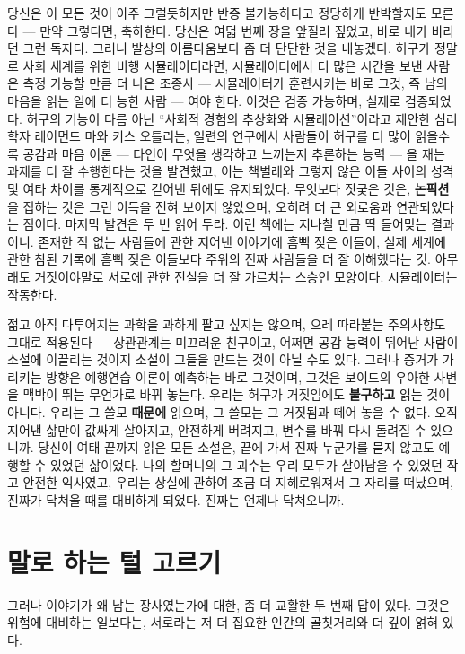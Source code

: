 당신은 이 모든 것이 아주 그럴듯하지만 반증 불가능하다고 정당하게 반박할지도 모른다 — 만약 그렇다면, 축하한다. 당신은 여덟 번째 장을 앞질러 짚었고, 바로 내가 바라던 그런 독자다. 그러니 발상의 아름다움보다 좀 더 단단한 것을 내놓겠다. 허구가 정말로 사회 세계를 위한 비행 시뮬레이터라면, 시뮬레이터에서 더 많은 시간을 보낸 사람은 측정 가능할 만큼 더 나은 조종사 — 시뮬레이터가 훈련시키는 바로 그것, 즉 남의 마음을 읽는 일에 더 능한 사람 — 여야 한다. 이것은 검증 가능하며, 실제로 검증되었다. 허구의 기능이 다름 아닌 ``사회적 경험의 추상화와 시뮬레이션''이라고 제안한 심리학자 레이먼드 마와 키스 오틀리는, 일련의 연구에서 사람들이 허구를 더 많이 읽을수록 공감과 마음 이론 — 타인이 무엇을 생각하고 느끼는지 추론하는 능력 — 을 재는 과제를 더 잘 수행한다는 것을 발견했고, 이는 책벌레와 그렇지 않은 이들 사이의 성격 및 여타 차이를 통계적으로 걷어낸 뒤에도 유지되었다. 무엇보다 짓궂은 것은, \textbf{논픽션}을 접하는 것은 그런 이득을 전혀 보이지 않았으며, 오히려 더 큰 외로움과 연관되었다는 점이다. 마지막 발견은 두 번 읽어 두라. 이런 책에는 지나칠 만큼 딱 들어맞는 결과이니. 존재한 적 없는 사람들에 관한 지어낸 이야기에 흠뻑 젖은 이들이, 실제 세계에 관한 참된 기록에 흠뻑 젖은 이들보다 주위의 진짜 사람들을 더 잘 이해했다는 것. 아무래도 거짓이야말로 서로에 관한 진실을 더 잘 가르치는 스승인 모양이다. 시뮬레이터는 작동한다.

젊고 아직 다투어지는 과학을 과하게 팔고 싶지는 않으며, 으레 따라붙는 주의사항도 그대로 적용된다 — 상관관계는 미끄러운 친구이고, 어쩌면 공감 능력이 뛰어난 사람이 소설에 이끌리는 것이지 소설이 그들을 만드는 것이 아닐 수도 있다. 그러나 증거가 가리키는 방향은 예행연습 이론이 예측하는 바로 그것이며, 그것은 보이드의 우아한 사변을 맥박이 뛰는 무언가로 바꿔 놓는다. 우리는 허구가 거짓임에도 \textbf{불구하고} 읽는 것이 아니다. 우리는 그 쓸모 \textbf{때문에} 읽으며, 그 쓸모는 그 거짓됨과 떼어 놓을 수 없다. 오직 지어낸 삶만이 값싸게 살아지고, 안전하게 버려지고, 변수를 바꿔 다시 돌려질 수 있으니까. 당신이 여태 끝까지 읽은 모든 소설은, 끝에 가서 진짜 누군가를 묻지 않고도 예행할 수 있었던 삶이었다. 나의 할머니의 그 괴수는 우리 모두가 살아남을 수 있었던 작고 안전한 익사였고, 우리는 상실에 관하여 조금 더 지혜로워져서 그 자리를 떠났으며, 진짜가 닥쳐올 때를 대비하게 되었다. 진짜는 언제나 닥쳐오니까.

\section*{말로 하는 털 고르기}

그러나 이야기가 왜 남는 장사였는가에 대한, 좀 더 교활한 두 번째 답이 있다. 그것은 위험에 대비하는 일보다는, 서로라는 저 더 집요한 인간의 골칫거리와 더 깊이 얽혀 있다.

